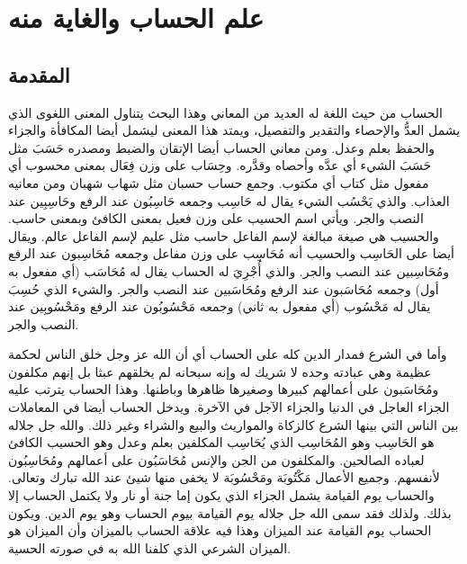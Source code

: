 \chapter{علم الحساب والغاية منه}

\section{المقدمة}

الحساب من حيث اللغة له العديد من المعاني وهذا البحث يتناول المعنى اللغوى الذي يشمل العدُّ والإحصاء والتقدير والتفصيل، ويمتد هذا المعنى ليشمل أيضا المكافأة والجزاء والحفظ بعلم وعدل. ومن معاني الحساب أيضا الإتقان والضبط ومصدره حَسَبَ مثل حَسَبَ الشيء أي عدَّه وأحصاه وقدَّره. وحِسَاب على وزن فِعَال بمعنى محسوب أي مفعول مثل كتاب أي مكتوب. وجمع حساب حسبان مثل شهاب شهبان ومن معانيه العذاب. والذي يَحْسُب الشيء يقال له حَاسِب وجمعه حَاسِبُون عند الرفع وحَاسِبِين عند النصب والجر. ويأتي اسم الحسيب  على وزن فعيل بمعنى الكافئ وبمعنى حاسب. والحسيب هي صيغة مبالغة لإسم الفاعل حاسب مثل عليم لإسم الفاعل عالم. ويقال أيضا على الحَاسِب والحسيب أنه مُحَاسِب على وزن مفاعل وجمعه مُحَاسِبون عند الرفع ومُحَاسِبين عند النصب والجر. والذي أُجْرِيَ له الحساب يقال له مُحَاسَب (أي مفعول به أول) وجمعه مُحَاسَبون عند الرفع ومُحَاسَبين عند النصب والجر. والشيء الذي حُسِبَ يقال له مَحْسُوب (أي مفعول به ثاني) وجمعه مَحْسُوبُون عند الرفع ومَحْسُوبِين عند النصب والجر. 

وأما في الشرع فمدار الدين كله على الحساب أي أن الله عز وجل خلق الناس لحكمة عظيمة وهي عبادته وحده لا شريك له وإنه سبحانه لم يخلقهم عبثا بل إنهم مكلفون ومُحَاسَبون على أعمالهم كبيرها وصغيرها ظاهرها وباطنها. وهذا الحساب يترتب عليه الجزاء العاجل في الدنيا والجزاء الآجل في الآخرة. ويدخل الحساب أيضا في المعاملات بين الناس التي بينها الشرع كالزكاة والمواريث والبيع والشراء وغير ذلك. والله جل جلاله هو الحَاسِب وهو المُحَاسِب الذي يُحَاسِب المكلفين بعلم وعدل وهو الحسيب الكافئ لعباده الصالحين. والمكلفون من الجن والإنس مُحَاسَبُون على أعمالهم ومُحَاسِبُون لأنفسهم. وجميع الأعمال مَكْتُوبَة ومَحْسُوبَة لا يخفى منها شيئ عند الله تبارك وتعالى. والحساب يوم القيامة يشمل الجزاء الذي يكون إما جنة أو نار ولا يكتمل الحساب إلا بذلك. ولذلك فقد سمى الله جل جلاله يوم القيامة بيوم الحساب وهو يوم الدين. ويكون الحساب يوم القيامة عند الميزان وهذا فيه علاقة الحساب بالميزان وأن الميزان هو الميزان الشرعي الذي كلفنا الله به في صورته الحسية. 

